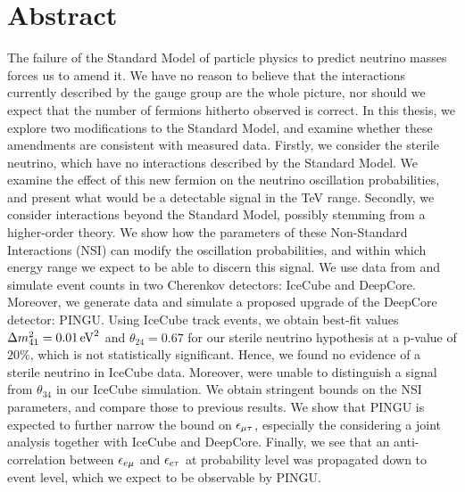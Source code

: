 \chapter*{Abstract}

The failure of the Standard Model of particle physics to predict neutrino masses forces us to amend it. We have no reason to believe that 
the interactions currently described by the gauge group are the whole picture, nor should we expect that the number of fermions hitherto observed is correct.
In this thesis, we explore two modifications to the Standard Model, and examine whether these amendments are consistent with measured data.
Firstly, we consider the sterile neutrino, which have no interactions described by the Standard Model. We examine the effect of this 
new fermion on the neutrino oscillation probabilities, and present what would be a detectable signal in the \si{\TeV} range.
Secondly, we consider interactions beyond the Standard Model, possibly stemming from a higher-order theory.
We show how the parameters of these Non-Standard Interactions (NSI) can modify the oscillation probabilities, and within which energy range we expect to be able to discern this signal.
We use data from and simulate event counts in two Cherenkov detectors: IceCube and DeepCore. Moreover, we generate data and simulate a proposed upgrade of the DeepCore detector: PINGU. 
Using IceCube track events, we obtain best-fit values $\dm[41] = \SI{0.01}{\eV^2}$ and $\theta_{24} = 0.67$ for our sterile neutrino hypothesis at 
a p-value of $20\%$, which is not statistically significant. Hence, we found no evidence of a sterile neutrino in IceCube data. 
Moreover, were unable to distinguish a signal from $\theta_{34}$ in our IceCube simulation.
We obtain stringent bounds on the NSI parameters, and compare those to previous results. We show that PINGU is expected to further narrow the bound 
on $\epsilon_{\mu\tau}$, especially the considering a joint analysis together with IceCube and DeepCore. Finally, we see that an anti-correlation between 
$\epsilon_{e\mu}$ and $\epsilon_{e\tau}$ at probability level was propagated down to event level, which we expect to be observable by PINGU.


